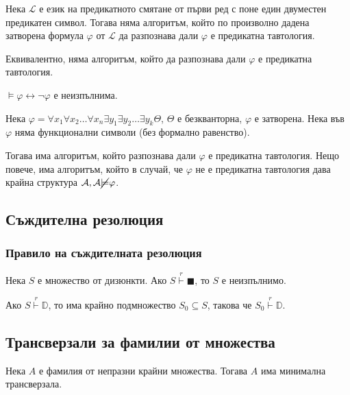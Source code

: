 \documentclass{article}
\begin{document}
\begin{thm}
Нека $\mathcal{L}$ е език на предикатното смятане от първи ред с поне един двуместен предикатен символ. Тогава няма алгоритъм, който по произволно дадена затворена формула $\varphi$ от $\mathcal{L}$ да разпознава дали $\varphi$ е предикатна тавтология.

Еквивалентно, няма алгоритъм, който да разпознава дали $\varphi$ е предикатна тавтология.

\begin{remark}
$\models \varphi \longleftrightarrow \neg\varphi$ е неизпълнима.
\end{remark}
\end{thm}

\begin{thm}
Нека $\varphi = \forall x_1\forall x_2\ldots\forall x_n\exists y_1\exists y_2\ldots\exists y_k\Theta$, $\Theta$ е безкванторна, $\varphi$ е затворена. Нека във $\varphi$ няма функционални символи (без формално равенство).

Тогава има алгоритъм, който разпознава дали $\varphi$  е предикатна тавтология. Нещо повече, има алгоритъм, който в случай, че $\varphi$ не е предикатна тавтология дава крайна структура $\mathcal{A}, \mathcal{A} \cancel{\models} \varphi$.
\end{thm}

\subsection*{Съждителна резолюция}
\subsubsection*{Правило на съждителната резолюция}

\begin{thm}
Нека $S$ е множество от дизюнкти. Ако $S \overset{r}{\vdash} \blacksquare$, то $S$ е неизпълнимо.

\setcounter{conseq}{0}
\begin{conseq}
Ако $S \overset{r}{\vdash} \mathbb{D}$, то има крайно подмножество $S_0 \subseteq S$, такова че $S_0 \overset{r}{\vdash} \mathbb{D}$.
\end{conseq}
\end{thm}

\subsection*{Трансверзали за фамилии от множества}
\begin{thm}
Нека $A$ е фамилия от непразни крайни множества. Тогава $A$ има минимална трансверзала.
\end{thm}
\end{document}
